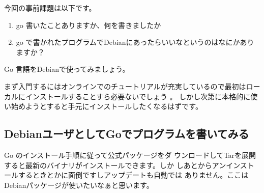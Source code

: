 \documentclass[mingoth,a4paper]{jsarticle}
\begin{document}


今回の事前課題は以下です。

\begin{enumerate}
 \item go 書いたことありますか、何を書きましたか
 \item go で書かれたプログラムでDebianにあったらいいなというのはなにかありますか？
\end{enumerate}


\begin{multicols}{2}
{\small
% 
}
\end{multicols}

%
%
%
%




Go 言語をDebianで使ってみましょう。

まず入門するにはオンラインでのチュートリアルが充実しているので最初はローカルにインストールすることすら必要ないでしょう\cite{golang:tourofgo}
\cite{golang:tourofgoja}。
しかし次第に本格的に使い始めようとすると手元にインストールしたくなるはずです。

\subsection{DebianユーザとしてGoでプログラムを書いてみる}

Go のインストール手順\cite{golangorg-install}に従って公式パッケージをダ
ウンロードしてTarを展開すると最新のバイナリがインストールできます。しか
しあとからアンインストールするときとかに面倒ですしアップデートも自動では
ありません。ここはDebianパッケージが使いたいなぁと思います。
\end{document}
